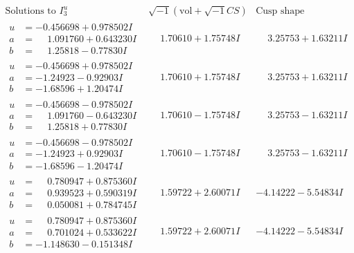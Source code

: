 \documentclass[1p]{elsarticle_modified}
\theoremstyle{definition}
\newcommand{\I}{\sqrt{-1}}
\begin{document}
$$\begin{array}{c|c|c}  
\text{Solutions to }I^u_{3}& \I (\text{vol} + \sqrt{-1}CS) & \text{Cusp shape}\\
 \hline 
\begin{aligned}
u &= -0.456698 + 0.978502 I \\
a &= \phantom{-}1.091760 + 0.643230 I \\
b &= \phantom{-}1.25818 - 0.77830 I\end{aligned}
 & \phantom{-}1.70610 + 1.75748 I & \phantom{-}3.25753 + 1.63211 I \\ \hline\begin{aligned}
u &= -0.456698 + 0.978502 I \\
a &= -1.24923 - 0.92903 I \\
b &= -1.68596 + 1.20474 I\end{aligned}
 & \phantom{-}1.70610 + 1.75748 I & \phantom{-}3.25753 + 1.63211 I \\ \hline\begin{aligned}
u &= -0.456698 - 0.978502 I \\
a &= \phantom{-}1.091760 - 0.643230 I \\
b &= \phantom{-}1.25818 + 0.77830 I\end{aligned}
 & \phantom{-}1.70610 - 1.75748 I & \phantom{-}3.25753 - 1.63211 I \\ \hline\begin{aligned}
u &= -0.456698 - 0.978502 I \\
a &= -1.24923 + 0.92903 I \\
b &= -1.68596 - 1.20474 I\end{aligned}
 & \phantom{-}1.70610 - 1.75748 I & \phantom{-}3.25753 - 1.63211 I \\ \hline\begin{aligned}
u &= \phantom{-}0.780947 + 0.875360 I \\
a &= \phantom{-}0.939523 + 0.590319 I \\
b &= \phantom{-}0.050081 + 0.784745 I\end{aligned}
 & \phantom{-}1.59722 + 2.60071 I & -4.14222 - 5.54834 I \\ \hline\begin{aligned}
u &= \phantom{-}0.780947 + 0.875360 I \\
a &= \phantom{-}0.701024 + 0.533622 I \\
b &= -1.148630 - 0.151348 I\end{aligned}
 & \phantom{-}1.59722 + 2.60071 I & -4.14222 - 5.54834 I \\ \hline\begin{aligned}

\end{aligned}
\end{array}$$
\end{document}
